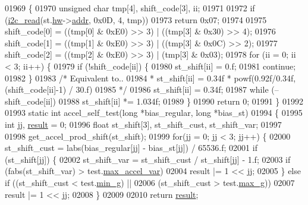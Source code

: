 \begin{DoxyCode}
{{{{{{{01969 \{
01970     \textcolor{keywordtype}{unsigned} \textcolor{keywordtype}{char} tmp[4], shift\_code[3], ii;
01971 
01972     \textcolor{keywordflow}{if} (\hyperlink{_i2_c_8c_ac2d47e7a6c76f93f9b537c31a2986e7b}{i2c\_read}(st.\hyperlink{structgyro__state__s_a5bac30a96752691e4cc723735060e360}{hw}->\hyperlink{structhw__s_a4c34a946600e9d68b6355d23f54d291b}{addr}, 0x0D, 4, tmp))
01973         \textcolor{keywordflow}{return} 0x07;
01974 
01975     shift\_code[0] = ((tmp[0] & 0xE0) >> 3) | ((tmp[3] & 0x30) >> 4);
01976     shift\_code[1] = ((tmp[1] & 0xE0) >> 3) | ((tmp[3] & 0x0C) >> 2);
01977     shift\_code[2] = ((tmp[2] & 0xE0) >> 3) | (tmp[3] & 0x03);
01978     \textcolor{keywordflow}{for} (ii = 0; ii < 3; ii++) \{
01979         \textcolor{keywordflow}{if} (!shift\_code[ii]) \{
01980             st\_shift[ii] = 0.f;
01981             \textcolor{keywordflow}{continue};
01982         \}
01983         \textcolor{comment}{/* Equivalent to..}
01984 \textcolor{comment}{         * st\_shift[ii] = 0.34f * powf(0.92f/0.34f, (shift\_code[ii]-1) / 30.f)}
01985 \textcolor{comment}{         */}
01986         st\_shift[ii] = 0.34f;
01987         \textcolor{keywordflow}{while} (--shift\_code[ii])
01988             st\_shift[ii] *= 1.034f;
01989     \}
01990     \textcolor{keywordflow}{return} 0;
01991 \}
01992 
01993 \textcolor{keyword}{static} \textcolor{keywordtype}{int} accel\_self\_test(\textcolor{keywordtype}{long} *bias\_regular, \textcolor{keywordtype}{long} *bias\_st)
01994 \{
01995     \textcolor{keywordtype}{int} jj, \hyperlink{sensor_8h_a4c9d9cb8bb9d2b707a152051408f40e5}{result} = 0;
01996     \textcolor{keywordtype}{float} st\_shift[3], st\_shift\_cust, st\_shift\_var;
01997 
01998     get\_accel\_prod\_shift(st\_shift);
01999     \textcolor{keywordflow}{for}(jj = 0; jj < 3; jj++) \{
02000         st\_shift\_cust = labs(bias\_regular[jj] - bias\_st[jj]) / 65536.f;
02001         \textcolor{keywordflow}{if} (st\_shift[jj]) \{
02002             st\_shift\_var = st\_shift\_cust / st\_shift[jj] - 1.f;
02003             \textcolor{keywordflow}{if} (fabs(st\_shift\_var) > test.\hyperlink{structtest__s_ad5bc54ab7d1b1a0f158ca1a79359c3bc}{max\_accel\_var})
02004                 result |= 1 << jj;
02005         \} \textcolor{keywordflow}{else} \textcolor{keywordflow}{if} ((st\_shift\_cust < test.\hyperlink{structtest__s_aa295cc026745ef7378eeff0c72638ed0}{min\_g}) ||
02006             (st\_shift\_cust > test.\hyperlink{structtest__s_a30dbaf47c9d41bf9e86370664d661bd0}{max\_g}))
02007             result |= 1 << jj;
02008     \}
02009 
02010     \textcolor{keywordflow}{return} \hyperlink{sensor_8h_a4c9d9cb8bb9d2b707a152051408f40e5}{result};
}}}}}}}
\end{DoxyCode}
